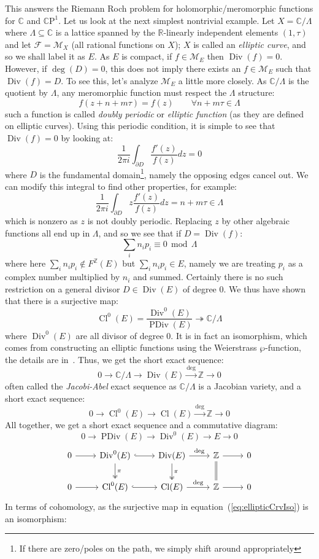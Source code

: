 \documentclass{book}
\newcommand{\R}{{\mathbb{R}}}
\newcommand{\Z}{{\mathbb{Z}}}
\newcommand{\C}{{\mathbb{C}}}
\newcommand{\CM}{{\mathcal{M}}}
\newcommand{\CF}{{\mathcal{F}}}
\newcommand{\CP}{{\mathbb{C}\mathrm{P}}}
\newcommand{\sse}{\subseteq}
\renewcommand{\mod}{\,\operatorname{mod}\,}
\newcommand{\Div}{{\operatorname{Div}}}
\newcommand{\PDiv}{{\operatorname{PDiv}}}
\renewcommand{\deg}{{\operatorname{deg}}}
\renewcommand{\div}{{\operatorname{Div}}}
\newcommand{\Cl}{{\operatorname{Cl}}}
\begin{document}
This answers the Riemann Roch problem for holomorphic/meromorphic functions for $\C$ and $\CP^1$. Let us look
at the next simplest nontrivial example. Let $X = \C/\Lambda$ where $\Lambda\sse \C$ is a lattice spanned by
the $\R$-linearly independent elements $(1,\tau)$ and let $\CF = \CM_X$ (all rational functions on $X$); $X$
is called an \emph{elliptic curve}, and so we shall label it as $E$. As $E$ is compact, if $f \in \CM_E$ then
$\div(f) = 0$. However, if $\deg(D) = 0$, this does not imply there exists an $f \in \CM_E$ such that $\div(f)
= D$. To see this, let's analyze $\CM_E$ a little more closely. As $\C/\Lambda$ is the quotient by $\Lambda$,
any meromorphic function must respect the $\Lambda$ structure:
\[
  f(z+n+m\tau) = f(z) \qquad \forall n+m\tau \in \Lambda
\]
such a function is called \emph{doubly periodic} or \emph{elliptic function} (as they are defined on elliptic
curves). Using this periodic condition, it is simple to see that
$\div(f) = 0$ by looking at:
\[
  \frac{1}{2\pi i}\int_{\partial D} \frac{f'(z)}{f(z)}dz = 0
\]
where $D$ is the fundamental domain\footnote{If there are zero/poles on the path, we simply shift around
appropriately}, namely the opposing edges cancel out. We can modify this integral to find other properties,
for example:
\[
  \frac{1}{2\pi i}\int_{\partial D} z\frac{f'(z)}{f(z)}dz = n + m\tau \in \Lambda
\]
which is nonzero as $z$ is not doubly periodic. Replacing $z$ by other algebraic functions all end up in
$\Lambda$, and so we see that if $D = \div(f)$:
\[
  \sum_i n_ip_i \equiv 0 \mod \Lambda
\]
where here $\sum_i n_ip_i\notin F^\Z(E)$ but $\sum_i n_ip_i \in E$, namely we are treating $p_i$ as a complex
number multiplied by $n_i$ and summed. Certainly there is no such restriction on
a general divisor $D \in \Div(E)$ of degree $0$. We thus have shown that there is a surjective map:
\begin{equation}\label{eq:ellipticCrvIso}
  \Cl^0(E) = \frac{\Div^0(E)}{\PDiv(E)} \twoheadrightarrow \C/\Lambda
\end{equation}
where $\Div^0(E)$ are all divisor of degree $0$. It is in fact an isomorphism, which comes from constructing
an elliptic functions using the Weierstrass $\wp$-function, the details are
in~\cite[chapter~5]{NateComplexAnalysis}. Thus, we get the short exact sequence:
\[
  0 \to \C/\Lambda \to \Div(E) \xrightarrow{\deg} \Z \to 0
\]
often called the \emph{Jacobi-Abel} exact sequence as $\C/\Lambda$ is a Jacobian variety, and a short exact sequence:
\[
  0 \to \Cl^0(E) \to \Cl(E) \xrightarrow{\deg} \Z \to 0
\]
All together, we get a short exact sequence and a commutative diagram:
\[
  0 \to \PDiv(E) \to \Div^0(E) \to E \to 0
\]
\[
\begin{tikzcd}
0 \arrow[r] & \mathrm{Div}^0(E) \arrow[r, hook] \arrow[d, two heads, "\pi"] & \mathrm{Div}(E) \arrow[r, "\deg"] \arrow[d, two heads, "\pi"] & \mathbb{Z} \arrow[r] \arrow[d, equals] & 0 \\
0 \arrow[r] & \Cl^0(E) \arrow[r, hook] & \Cl(E) \arrow[r, "\deg"] & \mathbb{Z} \arrow[r] & 0
\end{tikzcd}
\]
In terms of cohomology, as the surjective map in equation~(\ref{eq:ellipticCrvIso}) is an isomorphism:
\end{document}
